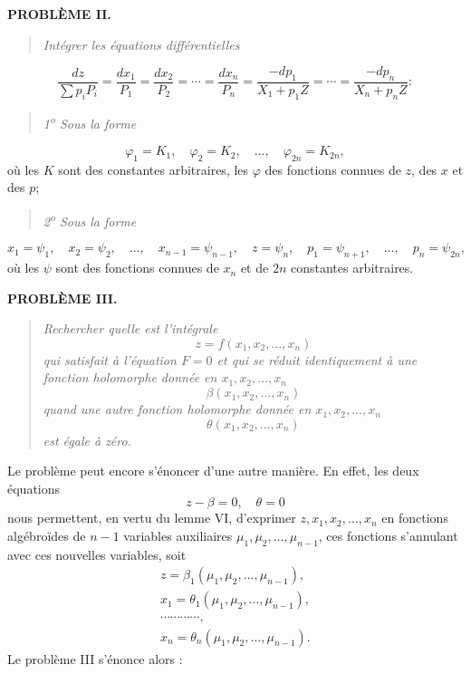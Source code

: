 \documentclass[11pt]{article}
\begin{document}
\begin{center}
\textbf{PROBLÈME II.}
\end{center}

\begin{quote}\itshape
Intégrer les équations différentielles
\end{quote}
\begin{equation*}\tag{4}
\frac{dz}{\sum p_iP_i}=\frac{dx_1}{P_1}=\frac{dx_2}{P_2}=\cdots=\frac{dx_n}{P_n}=\frac{-dp_1}{X_1+p_1Z}=\cdots=\frac{-dp_n}{X_n+p_nZ}:
\end{equation*}
\begin{quote}\itshape
1\textsuperscript{o} Sous la forme
\end{quote}
\begin{equation*}\tag{5}
\varphi_1=K_1,
\quad \varphi_2=K_2,
\quad \ldots,
\quad \varphi_{2n}=K_{2n},
\end{equation*}
où les $K$ sont des constantes arbitraires, les $\varphi$ des fonctions connues de $z$, des $x$ et des $p$;

\begin{quote}\itshape
2\textsuperscript{o} Sous la forme
\end{quote}
\begin{equation*}\tag{6}
x_1=\psi_1,
\quad x_2=\psi_2,
\quad \ldots,
\quad x_{n-1}=\psi_{n-1},
\quad z=\psi_n,
\quad p_1=\psi_{n+1},
\quad \ldots,
\quad p_n=\psi_{2n},
\end{equation*}
où les $\psi$ sont des fonctions connues de $x_n$ et de $2n$ constantes arbitraires.

\begin{center}
\textbf{PROBLÈME III.}
\end{center}

\begin{quote}\itshape
Rechercher quelle est l'intégrale
\[
z=f(x_1,x_2,\ldots,x_n)
\]
qui satisfait à l'équation $F=0$ et qui se réduit identiquement à une fonction holomorphe donnée en $x_1,x_2,\ldots,x_n$
\[
\beta(x_1,x_2,\ldots,x_n)
\]
quand une autre fonction holomorphe donnée en $x_1,x_2,\ldots,x_n$
\[
\theta(x_1,x_2,\ldots,x_n)
\]
est égale à zéro.
\end{quote}

Le problème peut encore s'énoncer d'une autre manière. En effet, les deux équations
\[
z-\beta=0,
\quad \theta=0
\]
nous permettent, en vertu du lemme VI, d'exprimer $z,x_1,x_2,\ldots,x_n$ en fonctions algébroïdes de $n-1$ variables auxiliaires $\mu_1,\mu_2,\ldots,\mu_{n-1}$, ces fonctions s'annulant avec ces nouvelles variables, soit
\[
\begin{gathered}
z=\beta_1(\mu_1,\mu_2,\ldots,\mu_{n-1}),\\
x_1=\theta_1(\mu_1,\mu_2,\ldots,\mu_{n-1}),\\
\cdots\cdots\cdots\cdots,\\
x_n=\theta_n(\mu_1,\mu_2,\ldots,\mu_{n-1}).
\end{gathered}
\]
Le problème III s'énonce alors :
\end{document}
